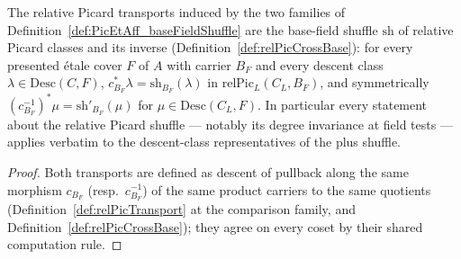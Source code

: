 \begin{theorem}
  \label{thm:PicEtAff_baseFieldShuffle_relPic}
  \leanok
  The relative Picard transports induced by the two families of
  Definition~\ref{def:PicEtAff_baseFieldShuffle} are the base-field shuffle
  \(\mathrm{sh}\) of relative Picard classes and its inverse
  (Definition~\ref{def:relPicCrossBase}): for every presented \'etale cover \(F\) of
  \(A\) with carrier \(B_F\) and every descent class
  \(\lambda \in \mathrm{Desc}(C, F)\),
  \(c_{B_F}^{*}\lambda = \mathrm{sh}_{B_F}(\lambda)\) in
  \(\mathrm{relPic}_L(C_L, B_F)\), and symmetrically
  \((c_{B_F}^{-1})^{*}\mu = \mathrm{sh}'_{B_F}(\mu)\) for
  \(\mu \in \mathrm{Desc}(C_L, F)\). In particular every statement about the relative
  Picard shuffle — notably its degree invariance at field tests — applies verbatim to
  the descent-class representatives of the plus shuffle.
\end{theorem}
\begin{proof}
  \leanok
  Both transports are defined as descent of pullback along the same morphism \(c_{B_F}\)
  (resp.\ \(c_{B_F}^{-1}\)) of the same product carriers to the same quotients
  (Definition~\ref{def:relPicTransport} at the comparison family, and
  Definition~\ref{def:relPicCrossBase}); they agree on every coset by their shared
  computation rule.
\end{proof}

